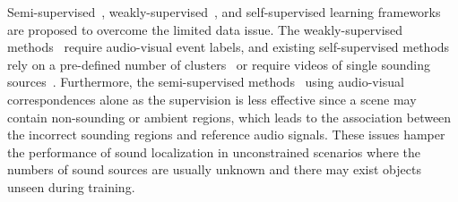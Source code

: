 Semi-supervised~\cite{av_cvpr18_lls,av_tpami20_lls}, weakly-supervised~\cite{av_eccv20_mms_loc}, and self-supervised learning frameworks~\cite{av_cvpr19_deep_cluster,av_arxiv_curricumlum_av_clutser,av_nips20_loc} are proposed to overcome the limited data issue.
%
The weakly-supervised methods~\cite{av_eccv20_mms_loc} require audio-visual event labels, and existing self-supervised methods rely on a pre-defined number of clusters~\cite{av_cvpr19_deep_cluster,av_arxiv_curricumlum_av_clutser} or require videos of single sounding sources~\cite{av_nips20_loc}.
%
Furthermore, the semi-supervised methods~\cite{av_cvpr18_lls,av_tpami20_lls} using audio-visual correspondences alone as the supervision is less effective since a scene may contain non-sounding or ambient regions, which leads to the association between the incorrect sounding regions and reference audio signals.
%
These issues hamper the performance of sound localization in unconstrained scenarios where the numbers of sound sources are usually unknown and there may exist objects unseen during training.


